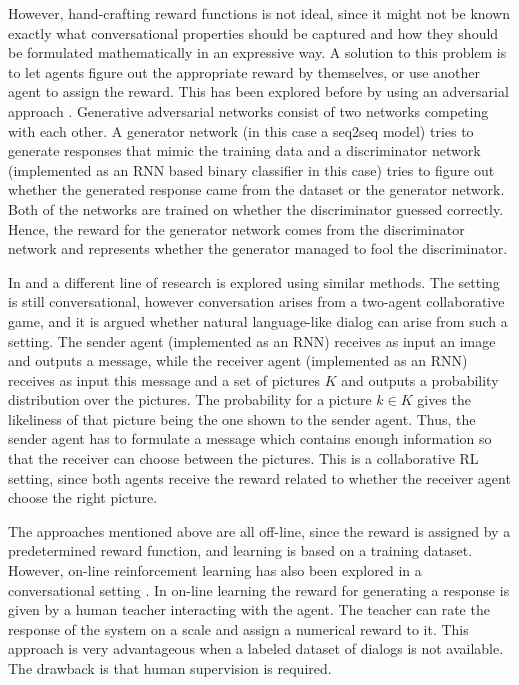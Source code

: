 \documentclass[12pt]{article}
\begin{document}
However, hand-crafting reward functions is not ideal, since it might not be known exactly what conversational properties should be captured and how they should be formulated mathematically in an expressive way. A solution to this problem is to let agents figure out the appropriate reward by themselves, or use another agent to assign the reward. This has been explored before by using an adversarial approach \cite{Li_adversarial:2017}. Generative adversarial networks \cite{Goodfellow:2014} consist of two networks competing with each other. A generator network (in this case a seq2seq model) tries to generate responses that mimic the training data and a discriminator network (implemented as an RNN based binary classifier in this case) tries to figure out whether the generated response came from the dataset or the generator network. Both of the networks are trained on whether the discriminator guessed correctly. Hence, the reward for the generator network comes from the discriminator network and represents whether the generator managed to fool the discriminator.

In \cite{Havrylov:2017} and \cite{Kottur:2017} a different line of research is explored using similar methods. The setting is still conversational, however conversation arises from a two-agent collaborative game, and it is argued whether natural language-like dialog can arise from such a setting. The sender agent (implemented as an RNN) receives as input an image and outputs a message, while the receiver agent (implemented as an RNN) receives as input this message and a set of pictures \(K\) and outputs a probability distribution over the pictures. The probability for a picture \(k\in K\) gives the likeliness of that picture being the one shown to the sender agent. Thus, the sender agent has to formulate a message which contains enough information so that the receiver can choose between the pictures. This is a collaborative RL setting, since both agents receive the reward related to whether the receiver agent choose the right picture.

The approaches mentioned above are all off-line, since the reward is assigned by a predetermined reward function, and learning is based on a training dataset. However, on-line reinforcement learning has also been explored in a conversational setting \cite{Li_HIL:2016}. In on-line learning the reward for generating a response is given by a human teacher interacting with the agent. The teacher can rate the response of the system on a scale and assign a numerical reward to it. This approach is very advantageous when a labeled dataset of dialogs is not available. The drawback is that human supervision is required.
\end{document}
